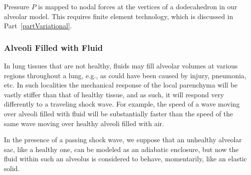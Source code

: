 Pressure $P$ is mapped to nodal forces at the vertices of a dodecahedron in our alveolar model.  This requires finite element technology, which is discussed in Part~\ref{partVariational}.

\subsubsection{Alveoli Filled with Fluid}

In lung tissues that are not healthy, fluids may fill alveolar volumes at various regions throughout a lung, e.g., as could have been caused by injury, pneumonia, etc.  In such localities the mechanical response of the local parenchyma will be vastly stiffer than that of healthy tissue, and as such, it will respond very differently to a traveling shock wave.  For example, the speed of a wave moving over alveoli filled with fluid will be substantially faster than the speed of the same wave moving over healthy alveoli filled with air.

In the presence of a passing shock wave, we suppose that an unhealthy alveolar sac, like a healthy one, can be modeled as an adiabatic enclosure, but now the fluid within such an alveolus is considered to behave, momentarily, like an elastic solid.

